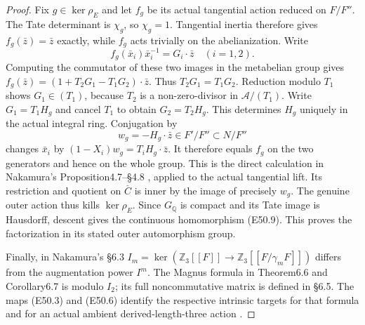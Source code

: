 \begin{proof}
Fix $g\in\ker\rho_E$ and let $f_g$
be its actual tangential action
reduced on $F/F''$. The Tate
determinant is $\chi_g$, so
$\chi_g=1$. Tangential inertia
therefore gives $f_g(\bar z)=\bar z$
exactly, while $f_g$ acts trivially
on the abelianization. Write
\[
 f_g(\bar x_i)\bar x_i^{-1}
      =G_i\cdot\bar z\quad(i=1,2).
 \tag{E50.24}
\]
Computing the commutator of these
two images in the metabelian
group gives
$f_g(\bar z)=(1+T_2G_1-T_1G_2)
\cdot\bar z$. Thus
$T_2G_1=T_1G_2$. Reduction modulo
$T_1$ shows $G_1\in(T_1)$,
because $T_2$ is a non-zero-divisor
in $\mathcal A/(T_1)$. Write
$G_1=T_1H_g$ and cancel $T_1$
to obtain $G_2=T_2H_g$.
This determines $H_g$ uniquely
in the actual integral ring.
Conjugation by
\[
 w_g=-H_g\cdot\bar z\in F'/F''
                           \subset N/F''
 \tag{E50.25}
\]
changes $\bar x_i$ by
$(1-X_i)w_g=T_iH_g\cdot\bar z$.
It therefore equals $f_g$ on the
two generators and hence on the
whole group. This is the direct
calculation in Nakamura's
Proposition4.7--\S4.8
\cite{A_Nakamura1995}, applied
to the actual tangential lift.
Its restriction and quotient
on $\overline C$ is inner by
the image of precisely $w_g$.
The genuine outer action thus
kills $\ker\rho_E$. Since
$G_{\mathbb Q}$ is compact
and its Tate image is
Hausdorff, descent gives the
continuous homomorphism
(E50.9). This proves the
factorization in its stated
outer automorphism group.

Finally, in Nakamura's \S6.3
$I_m=\ker(\mathbb Z_3[[F]]\to
\mathbb Z_3[[F/\gamma_mF]])$ differs
from the augmentation power $I^m$.
The Magnus formula in Theorem6.6
and Corollary6.7 is modulo $I_2$;
its full noncommutative matrix is
defined in \S6.5. The maps
(E50.3) and (E50.6) identify the
respective intrinsic targets for
that formula and for an actual
ambient derived-length-three
action \cite{A_Nakamura1995}.
\end{proof}
